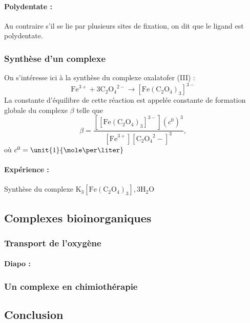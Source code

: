 \paragraph{Polydentate :} Au contraire s'il se lie par plusieurs sites de fixation, on dit que le ligand est polydentate.



\subsubsection{Synthèse d'un complexe}

On s'intéresse ici à la synthèse du complexe oxalatofer (III) :
\begin{equation*}
\mathrm{Fe}^{3+} + 3 \mathrm{C_2O_4}^{2-} \rightarrow \mathrm{[Fe(C_2O_4)_3]}^{3-}
\end{equation*}
La constante d'équilibre de cette réaction est appelée constante de formation globale du complexe $\beta$ telle que
\begin{equation*}
\beta = \frac{[\mathrm{[Fe(C_2O_4)_3]}^{3-}](c^0)^3}{[\mathrm{Fe}^{3+}][\mathrm{C_2O_4}^2-]^3},
\end{equation*}
où $c^0 = \unit{1}{\mole\per\liter}$

\paragraph{Expérience :} Synthèse du complexe $\mathrm{K_3[Fe(C_2O_4)_3],3H_2O}$

\subsection{Complexes bioinorganiques}

\subsubsection{Transport de l'oxygène}

\paragraph{Diapo : }

\subsubsection{Un complexe en chimiothérapie}

\subsection{Conclusion}